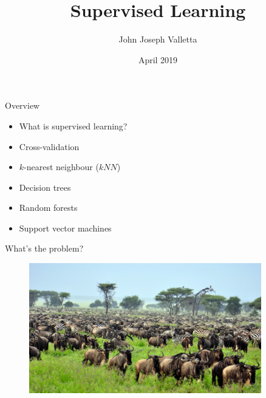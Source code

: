 \documentclass[pdf]{beamer}
\title[Supervised Learning]{Supervised Learning}
\author{John Joseph Valletta}
\date[April 2019]{April 2019}
\institute[]{University of Exeter, Penryn Campus, UK}
\begin{document}
\begin{frame}
\titlepage
\end{frame}

\begin{frame}{Overview}
\begin{itemize}\addtolength{\itemsep}{0.5\baselineskip}
	\item What is supervised learning?
	\item Cross-validation
	\item $k$-nearest neighbour ($kNN$)
	\item Decision trees
	\item Random forests
	\item Support vector machines
\end{itemize}
\end{frame}

\begin{frame}{What's the problem?}
\begin{center}
\begin{figure}
	\includegraphics[width=0.9\textwidth]{04-serengeti.png}
\end{figure}
\end{center}
\vfill
\centering
{}
\end{frame}
\end{document}
